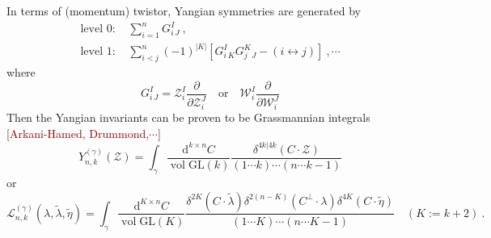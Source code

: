 \documentclass[10pt]{beamer}
\newcommand{\dif}{\mathrm{d}}
\renewcommand{\tilde}{\widetilde}
\begin{document}
\begin{frame}
\footnotesize
In terms of (momentum) twistor, Yangian symmetries are generated by
\begin{align*}
  \text{level 0:   }& \sum_{i=1}^{n}G_{i}^{I}{}_{J}\:, \\
  \text{level 1:   }& \sum_{i<j}^{n}(-1)^{\lvert K\rvert} [G_{i}^{I}{}_{K}G_{j}^{K}{}_{J}-(i\leftrightarrow j)]  \:, \cdots
\end{align*}
where 
\begin{equation*}
  G_{i}^{I}{}_{J}= \mathcal{Z}_{i}^{I}\frac{\partial}{\partial \mathcal{Z}_{i}^{J}}\quad \text{or}\quad   \mathcal{W}_{i}^{I}\frac{\partial}{\partial \mathcal{W}_{i}^{J}}
\end{equation*}
Then the Yangian invariants can be proven to be Grassmannian integrals [{\textcolor{darkred}{Arkani-Hamed, Drummond,$\cdots$}}]
\begin{equation*}
  Y_{n,k}^{(\gamma)}(\mathcal{Z})=\int_{\gamma} \frac{\dif^{k\times n} C}{\operatorname{vol}\mathrm{GL}(k)} \frac{\delta^{4k\vert 4k}(C \cdot \mathcal{Z})}{(1\cdots k)\cdots (n\cdots k-1)} \label{grassforYangian}
\end{equation*}
or
\begin{equation*}
  \mathcal{L}_{n,k}^{(\gamma)}(\lambda,\tilde{\lambda},\tilde{\eta}) = \int_{\gamma} \frac{\dif^{K\times n}C}{\operatorname{vol}\mathrm{GL}(K)}
  \frac{\delta^{2K}(C\cdot \tilde{\lambda})\delta^{2(n-K)}(C^{\perp}\cdot \lambda)\delta^{4K}(C\cdot \tilde{\eta})}{(1\cdots K)\cdots (n\cdots K{-}1)}  \quad (K:=k+2)\:.\label{grassforLS}
\end{equation*}
\end{frame}
\end{document}
